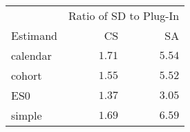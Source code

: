 \captionsetup[table]{labelformat=empty,skip=1pt}
\begin{longtable}{lrr}
\toprule
 & \multicolumn{2}{c}{Ratio of SD to Plug-In} \\ 
 \cmidrule(lr){2-3}
Estimand & CS & SA \\ 
\midrule
calendar & $1.71$ & $5.54$ \\ 
cohort & $1.55$ & $5.52$ \\ 
ES0 & $1.37$ & $3.05$ \\ 
simple & $1.69$ & $6.59$ \\ 
 \bottomrule
\end{longtable}

